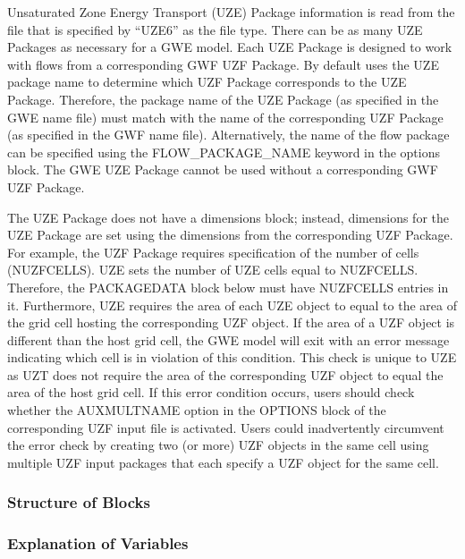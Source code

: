 Unsaturated Zone Energy Transport (UZE) Package information is read from the file that is specified by ``UZE6'' as the file type.  There can be as many UZE Packages as necessary for a GWE model. Each UZE Package is designed to work with flows from a corresponding GWF UZF Package. By default \mf uses the UZE package name to determine which UZF Package corresponds to the UZE Package.  Therefore, the package name of the UZE Package (as specified in the GWE name file) must match with the name of the corresponding UZF Package (as specified in the GWF name file).  Alternatively, the name of the flow package can be specified using the FLOW\_PACKAGE\_NAME keyword in the options block.  The GWE UZE Package cannot be used without a corresponding GWF UZF Package.

The UZE Package does not have a dimensions block; instead, dimensions for the UZE Package are set using the dimensions from the corresponding UZF Package.  For example, the UZF Package requires specification of the number of cells (NUZFCELLS).  UZE sets the number of UZE cells equal to NUZFCELLS.  Therefore, the PACKAGEDATA block below must have NUZFCELLS entries in it.  Furthermore, UZE requires the area of each UZE object to equal to the area of the grid cell hosting the corresponding UZF object.  If the area of a UZF object is different than the host grid cell, the GWE model will exit with an error message indicating which cell is in violation of this condition. This check is unique to UZE as UZT does not require the area of the corresponding UZF object to equal the area of the host grid cell.  If this error condition occurs, users should check whether the AUXMULTNAME option in the OPTIONS block of the corresponding UZF input file is activated.  Users could inadvertently circumvent the error check by creating two (or more) UZF objects in the same cell using multiple UZF input packages that each specify a UZF object for the same cell.

\vspace{5mm}
\subsubsection{Structure of Blocks}




\vspace{5mm}
\subsubsection{Explanation of Variables}
\begin{description}

\end{description}


